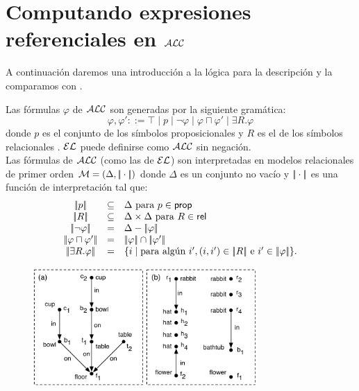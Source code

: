 \section{Computando expresiones referenciales en $\mathcal{ALC}$}
\label{sec:bisimulacion}

%

A continuaci\'on daremos una introducci\'on a la l\'ogica para la descripci\'on \alc y la comparamos con \el. %

Las f\'ormulas $\varphi$ de $\mathcal{ALC}$ son generadas por la siguiente gram\'atica:
$$
\varphi,\varphi' ::= \top \mid p \mid \neg \varphi \mid \varphi \sqcap \varphi'
\mid \exists R. \varphi
$$
donde $p$ es el conjunto de los s\'imbolos proposicionales \prop y $R$ es el de los s\'imbolos relacionales \rel. $\mathcal{EL}$ puede definirse como $\mathcal{ALC}$ sin negaci\'on.\\

Las f\'ormulas de $\mathcal{ALC}$ (como las de $\mathcal{EL}$) son interpretadas en modelos relacionales de primer orden $\mathcal{M} = (\Delta,|\!|\cdot|\!|)$ donde
$\Delta$ es un conjunto no vac\'io y $|\!|\cdot|\!|$ es una funci\'on de interpretaci\'on tal que:
$$
\begin{array}{ccl}
\interp{p} & \subseteq & \Delta  \mbox{ para $p \in \prop$}\\
\interp{R} & \subseteq & \Delta \times \Delta  \mbox{ para $R \in \rel$}\\
\interp{\neg \varphi} & = & \Delta - \interp{\varphi}\\
\interp{\varphi \sqcap \varphi'} & = & \interp{\varphi} \cap \interp{\varphi'}\\
\interp{\exists R.\varphi} & = & \{i \mid \mbox{para alg\'un } i', (i,i') \in \interp{R} \mbox{ e } i' \in \interp{\varphi} \}.\\
\end{array}
$$

\begin{figure}[t]
\begin{center}
\includegraphics[width=8.5cm]{figures/pic-dale-haddock.pdf}\\[0pt]
\caption{}
\label{fig:dale-haddock}
\end{center}
\end{figure}


